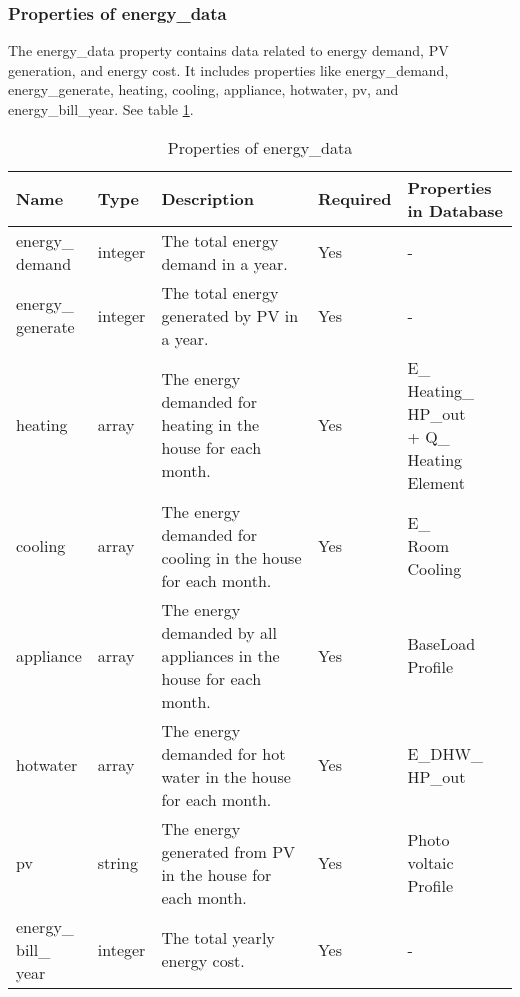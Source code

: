\subsubsection{Properties of energy\_data}

The energy\_data property contains data related to energy demand, PV generation, and energy cost. 
It includes properties like energy\_demand, energy\_generate, heating, cooling, appliance, hotwater, pv, and energy\_bill\_year.
See table \ref{tab:properties_energydata}. 

\begin{table}[h!]
    \centering
    \small
    \begin{tabular}{ | p{} | p{} | p{} | p{} | p{} | } 
    \hline
    Name & Type & Description & Required & Properties in Database \\
    \hline
    \makecell{energy\_\\demand} & integer & The total energy demand in a year. & Yes & - \\
    \hline
    \makecell{energy\_\\generate} & integer & The total energy generated by PV in a year. & Yes & - \\
    \hline
    heating & array & The energy demanded for heating in the house for each month. & Yes & \makecell{E\_\\Heating\_\\HP\_out \\+ Q\_\\Heating\\Element} \\
    \hline
    cooling & array & The energy demanded for cooling in the house for each month. & Yes & \makecell{E\_\\Room\\Cooling} \\
    \hline
    appliance & array & The energy demanded by all appliances in the house for each month. & Yes & \makecell{BaseLoad\\Profile} \\
    \hline
    hotwater & array & The energy demanded for hot water in the house for each month. & Yes & \makecell{E\_DHW\_\\HP\_out} \\
    \hline
    pv & string & The energy generated from PV in the house for each month. & Yes & \makecell{Photo\\voltaic\\Profile} \\
    \hline
    \makecell{energy\_\\bill\_\\year} & integer & The total yearly energy cost. & Yes & - \\
    \hline
    \end{tabular}
    \caption{Properties of energy\_data}
    \label{tab:properties_energydata}
\end{table}


